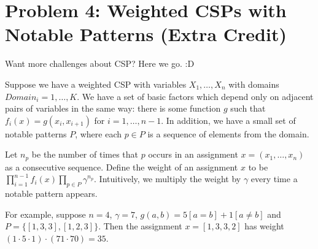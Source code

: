 \documentclass[10pt]{article}
\begin{document}
\section*{\normalsize Problem 4: Weighted CSPs with Notable Patterns (Extra Credit)}

Want more challenges about CSP? Here we go. :D
\smallskip

Suppose we have a weighted CSP with variables $X_1, \dots, X_n$ with domains $Domain_i = {1, \dots, K}$. We have a set of basic factors which depend only on adjacent pairs of variables in the same way: there is some function $g$ such that $f_i(x) = g(x_i, x_{i+1})$ for $i = 1, \dots, n−1$. In addition, we have a small set of notable patterns $P$, where each $p \in P$ is a sequence of elements from the domain.
\smallskip

Let $n_p$ be the number of times that $p$ occurs in an assignment $x = (x_1, \dots, x_n)$ as a consecutive sequence. Define the weight of an assignment $x$ to be $\prod_{i=1}^{n−1} f_i(x) \prod_{p \in P} \gamma^{n_p}$. Intuitively, we multiply the weight by $\gamma$ every time a notable pattern appears.
\smallskip

For example, suppose $n = 4$, $\gamma = 7$, $g(a,b)= 5[a = b] + 1[a \neq b]$ and $P = \{[1,3,3],[1,2,3]\}$. Then the assignment $x = [1,3,3,2]$ has weight $(1 \cdot 5 \cdot 1) \cdot (71 \cdot 70) = 35$. 
\end{document}
